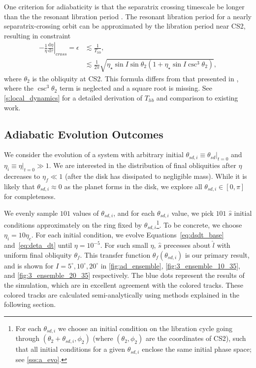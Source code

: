\documentclass[
        fleqn,
        usenatbib,
        referee,
    ]{mnras}
\newcommand*{\rd}[2]{\frac{\mathrm{d}#1}{\mathrm{d}#2}}
\newcommand*{\at}[1]{\left.#1\right|}
\newcommand*{\p}[1]{\left(#1\right)}
\begin{document}
One criterion for adiabaticity is that the separatrix crossing timescale be
longer than the the resonant libration period \citep{ward2004II}. The resonant
libration period for a nearly separatrix-crossing orbit can be approximated by
the libration period near CS2, resulting in constraint
\begin{align}
    -\at{\frac{1}{\eta}\rd{\eta}{\tau}}_{cross} = \epsilon &\lesssim
            \frac{1}{T_{lib}},\\
        &\lesssim \frac{1}{2\pi}\sqrt{\eta_\star\sin I \sin \theta_2
            \p{1 + \eta_\star \sin I \csc^3 \theta_2}},
            \label{eq:ad_constr}
\end{align}
where $\theta_2$ is the obliquity at CS2. This formula differs from that
presented in \citet{millholland_disk}, where the $\csc^3\theta_2$ term is
neglected and a square root is missing. See \autoref{s:local_dynamics} for a
detailed derivation of $T_{lib}$ and comparison to existing work.

\subsection{Adiabatic Evolution Outcomes}\label{ss:ad_ensemble}

We consider the evolution of a system with arbitrary initial $\theta_{sd, i}
\equiv \at{\theta_{sd}}_{t = 0}$ and $\eta_i \equiv \at{\eta}_{t = 0} \gg 1$. We
are interested in the distribution of final obliquities after $\eta$ decreases
to $\eta_f \ll 1$ (after the disk has dissipated to negligible mass). While it
is likely that $\theta_{sd, i} \approx 0$ as the planet forms in the disk, we
explore all $\theta_{sd, i} \in [0, \pi]$ for completeness.

We evenly sample $101$ values of $\theta_{sd, i}$, and for each $\theta_{sd, i}$
value, we pick $101$ $\hat{s}$ initial conditions approximately on the ring
fixed by $\theta_{sd, i}$\footnote{For each $\theta_{sd, i}$ we choose an
initial condition on the libration cycle going through $\p{\theta_2 +
\theta_{sd, i}, \phi_2}$ (where $\p{\theta_2, \phi_2}$ are the coordinates of
CS2), such that all initial conditions for a given $\theta_{sd, i}$ enclose the
same initial phase space; see \autoref{sss:a_evo}.}. To be concrete, we choose
$\eta_i = 10\eta_c$. For each initial condition, we evolve
Equations~\ref{eq:dsdt_base} and~\ref{eq:deta_dt} until $\eta = 10^{-5}$. For
such small $\eta$, $\hat{s}$ precesses about $\hat{l}$ with uniform final
obliquity $\theta_f$. This transfer function $\theta_f\p{\theta_{sd, i}}$ is our
primary result, and is shown for $I = 5^\circ, 10^\circ, 20^\circ$ in
\autoref{fig:ad_ensemble}, \autoref{fig:3_ensemble_10_35}, and
\autoref{fig:3_ensemble_20_35} respectively. The blue dots represent the results
of the simulation, which are in excellent agreement with the colored tracks.
These colored tracks are calculated semi-analytically using methods explained in
the following section.
\end{document}
